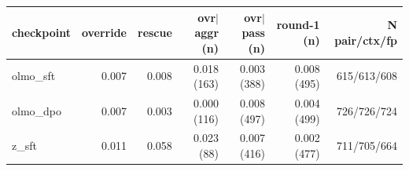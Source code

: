 \begin{tabular}{lrrrrrr}
\toprule
checkpoint & override & rescue & ovr$|$aggr (n) & ovr$|$pass (n) & round-1 (n) & N pair/ctx/fp \\
\midrule
olmo\_sft & 0.007 & 0.008 & 0.018 (163) & 0.003 (388) & 0.008 (495) & 615/613/608 \\
olmo\_dpo & 0.007 & 0.003 & 0.000 (116) & 0.008 (497) & 0.004 (499) & 726/726/724 \\
z\_sft & 0.011 & 0.058 & 0.023 (88) & 0.007 (416) & 0.002 (477) & 711/705/664 \\
\bottomrule
\end{tabular}
